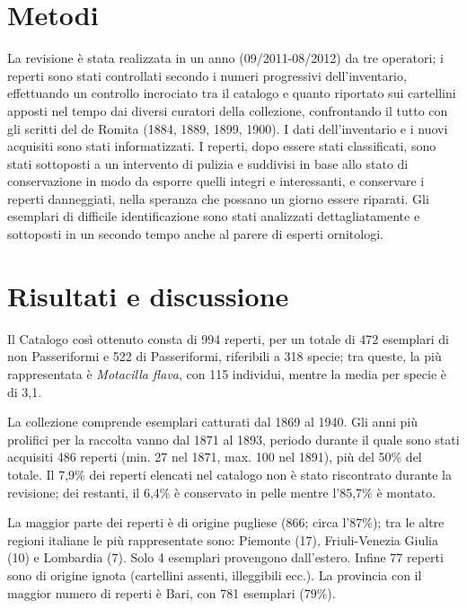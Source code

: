 \section*{Metodi}

La revisione \`e stata realizzata in un anno (09/2011-08/2012) da tre
operatori; i reperti sono stati controllati secondo i numeri
progressivi dell'inventario, effettuando un controllo
incrociato tra il catalogo e quanto riportato sui cartellini apposti
nel tempo dai diversi curatori della collezione, confrontando il tutto
con gli scritti del de Romita (1884, 1889, 1899, 1900). I dati
dell'inventario e i nuovi acquisiti sono stati
informatizzati. I reperti, dopo essere stati classificati, sono stati
sottoposti a un intervento di pulizia e suddivisi in base allo stato di
conservazione in modo da esporre quelli integri e interessanti, e
conservare i reperti danneggiati, nella speranza che possano un giorno
essere riparati. Gli esemplari di difficile identificazione sono stati
analizzati dettagliatamente e sottoposti in un secondo tempo anche al
parere di esperti ornitologi.

\section*{Risultati e discussione}

Il Catalogo cos\`i ottenuto consta di 994 reperti, per un totale di 472
esemplari di non Passeriformi e 522 di Passeriformi, riferibili a 318
specie; tra queste, la pi\`u rappresentata \`e \textit{Motacilla
flava}, con 115 individui, mentre la media per specie \`e di 3,1. 

La collezione comprende esemplari catturati dal 1869 al 1940. Gli anni
pi\`u prolifici per la raccolta vanno dal 1871 al 1893, periodo durante
il quale sono stati acquisiti 486 reperti (min. 27 nel 1871, max. 100
nel 1891), pi\`u del 50\% del totale. Il 7,9\% dei reperti elencati nel
catalogo non \`e stato riscontrato durante la revisione; dei restanti,
il 6,4\% \`e conservato in pelle mentre l'85,7\% \`e
montato.

La maggior parte dei reperti \`e di origine pugliese (866; circa
l{\textquoteright}87\%); tra le altre regioni italiane le pi\`u
rappresentate sono: Piemonte (17), Friuli-Venezia Giulia (10) e
Lombardia (7). Solo 4 esemplari provengono dall{\textquoteright}estero.
Infine 77 reperti sono di origine ignota (cartellini assenti,
illeggibili ecc.). La provincia con il maggior numero di reperti \`e
Bari, con 781 esemplari (79\%).

